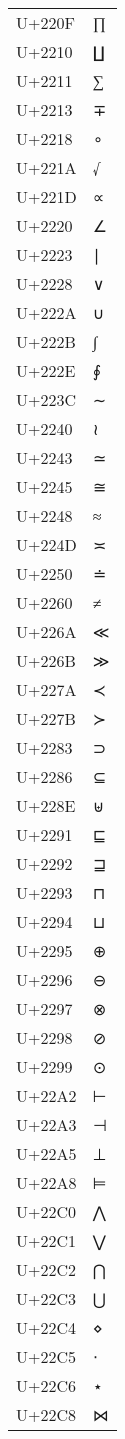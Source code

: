 \documentclass{article}
\begin{document}
\begin{longtable}{ll}
U+220F & ∏ \\
U+2210 & ∐ \\
U+2211 & ∑ \\
U+2213 & ∓ \\
U+2218 & ∘ \\
U+221A & √ \\
U+221D & ∝ \\
U+2220 & ∠ \\
U+2223 & ∣ \\
U+2228 & ∨ \\
U+222A & ∪ \\
U+222B & ∫ \\
U+222E & ∮ \\
U+223C & ∼ \\
U+2240 & ≀ \\
U+2243 & ≃ \\
U+2245 & ≅ \\
U+2248 & ≈ \\
U+224D & ≍ \\
U+2250 & ≐ \\
U+2260 & ≠ \\
U+226A & ≪ \\
U+226B & ≫ \\
U+227A & ≺ \\
U+227B & ≻ \\
U+2283 & ⊃ \\
U+2286 & ⊆ \\
U+228E & ⊎ \\
U+2291 & ⊑ \\
U+2292 & ⊒ \\
U+2293 & ⊓ \\
U+2294 & ⊔ \\
U+2295 & ⊕ \\
U+2296 & ⊖ \\
U+2297 & ⊗ \\
U+2298 & ⊘ \\
U+2299 & ⊙ \\
U+22A2 & ⊢ \\
U+22A3 & ⊣ \\
U+22A5 & ⊥ \\
U+22A8 & ⊨ \\
U+22C0 & ⋀ \\
U+22C1 & ⋁ \\
U+22C2 & ⋂ \\
U+22C3 & ⋃ \\
U+22C4 & ⋄ \\
U+22C5 & ⋅ \\
U+22C6 & ⋆ \\
U+22C8 & ⋈ \\

\end{longtable}
\end{document}
